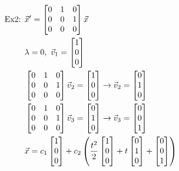 \documentclass[11pt, fleqn]{article}
\begin{document}
\begin{align*}
    \text{Ex2: }&\vec{x}'=\matrixx{0&1&0\\0&0&1\\0&0&0}\vec{x}\\
    &\lambda=0,\ \vec{v}_1=\matrixx{1\\0\\0}\\
    &\matrixx{0&1&0\\0&0&1\\0&0&0}\vec{v}_2=\matrixx{1\\0\\0}\to \vec{v}_2=\matrixx{0\\1\\0}\\
    &\matrixx{0&1&0\\0&0&1\\0&0&0}\vec{v}_3=\matrixx{0\\1\\0}\to\vec{v}_3=\matrixx{0\\0\\1}\\
    &\vec{x}=c_1\matrixx{1\\0\\0}+c_2\brround{\frac{t^2}{2}\matrixx{1\\0\\0}+t\matrixx{0\\1\\0}+\matrixx{0\\0\\1}}
\end{align*}
\end{document}
